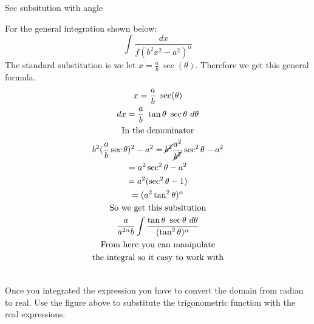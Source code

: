 \documentclass[letterpaper,10pt,twoside,twocolumn,openany]{book}
\begin{document}
\newpage
\begin{paperbox}[]{Sec subsitution with angle}

    For the general integration shown below:
    \begin{equation}
        \int \frac{dx}{f(b^2x^2 - a^2)^\alpha}
    \end{equation}
    The standard substitution is we let $x = \frac{a}{b}\ \sec(\theta)$. Therefore we get this general formula.
    \begin{gather*}
        x = \frac{a}{b}\ \sec(\theta)\\
        dx =  \frac{a}{b}\ \tan\theta\ \sec\theta\ d\theta\\
        \text{In the demoninator}\\
        b^2(\frac{a}{b} \sec\theta)^2 - a^2 =\cancel{b^2} \frac{a^2}{\cancel{b^2}}\sec^2\theta - a^2\\ 
        = a^2 \sec^2\theta - a^2\\
        = a^2(\sec^2\theta - 1)\\
        = (a^2 \tan^2\theta)^\alpha\\
        \text{So we get this subsitution}\\
        \frac{a}{a^{2\alpha}b} \int \frac{\tan\theta\ \sec\theta\ d\theta}{(\tan^2\theta)^\alpha}\\
        \text{From here you can manipulate}\\
        \text{the integral so it easy to work with}
    \end{gather*}

    \centering
    \\
    Once you integrated the expression you have to convert the domain from radian to real. Use the figure above to substitute the trigonometric function with the real expressions.
\end{paperbox}


\newpage
\end{document}
